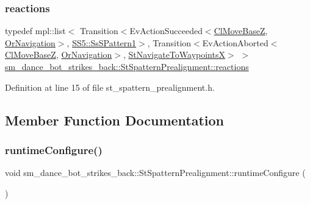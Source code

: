 \subsubsection{\texorpdfstring{reactions}{reactions}}
{\footnotesize\ttfamily typedef mpl\+::list$<$ Transition$<$Ev\+Action\+Succeeded$<$\hyperlink{classmove__base__z__client_1_1ClMoveBaseZ}{Cl\+Move\+BaseZ}, \hyperlink{classsm__dance__bot__strikes__back_1_1OrNavigation}{Or\+Navigation}$>$, \hyperlink{structsm__dance__bot__strikes__back_1_1SS5_1_1SsSPattern1}{S\+S5\+::\+Ss\+S\+Pattern1}$>$, Transition$<$Ev\+Action\+Aborted$<$\hyperlink{classmove__base__z__client_1_1ClMoveBaseZ}{Cl\+Move\+BaseZ}, \hyperlink{classsm__dance__bot__strikes__back_1_1OrNavigation}{Or\+Navigation}$>$, \hyperlink{structsm__dance__bot__strikes__back_1_1StNavigateToWaypointsX}{St\+Navigate\+To\+WaypointsX}$>$ $>$ \hyperlink{structsm__dance__bot__strikes__back_1_1StSpatternPrealignment_ac474c30f4538ff38707a3ce571a635a0}{sm\+\_\+dance\+\_\+bot\+\_\+strikes\+\_\+back\+::\+St\+Spattern\+Prealignment\+::reactions}}



Definition at line 15 of file st\+\_\+spattern\+\_\+prealignment.\+h.



\subsection{Member Function Documentation}
\mbox{\label{structsm__dance__bot__strikes__back_1_1StSpatternPrealignment_ad9edd102ef86322d26c9c03a757805b3}} 
\subsubsection{\texorpdfstring{runtime\+Configure()}{runtimeConfigure()}}
{\footnotesize\ttfamily void sm\+\_\+dance\+\_\+bot\+\_\+strikes\+\_\+back\+::\+St\+Spattern\+Prealignment\+::runtime\+Configure (\begin{DoxyParamCaption}{ }\end{DoxyParamCaption})\hspace{0.3cm}{\ttfamily [inline]}}



